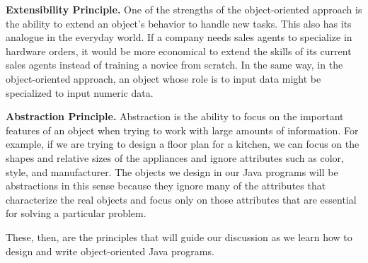 \begin{BL}
\item {\bf Extensibility Principle.} One of the strengths of the
object-oriented approach is the ability to extend an object's behavior
to handle new tasks. This also has its analogue in the everyday
world. If a company needs sales agents to specialize in hardware
orders, it would be more economical to extend the skills of its
current sales agents instead of training a novice from scratch.  In
the same way, in the object-oriented approach, an object whose role is
to input data might be specialized to input numeric data.

\item {\bf Abstraction Principle.} Abstraction is the ability to focus
on the important features of an object when trying to work with
large amounts of information.  For example, if we are trying to
design a floor plan for a kitchen, we can focus on the shapes
and relative sizes of the appliances and ignore attributes such
as color, style, and manufacturer.  The objects we design in
our Java programs will be abstractions in this sense because they
ignore many of the attributes that characterize the real objects
and focus only on those attributes that are essential for solving
a particular problem.


\end{BL}

\noindent These, then, are the principles that will guide our
discussion as we learn how to design and write object-oriented Java
programs.

